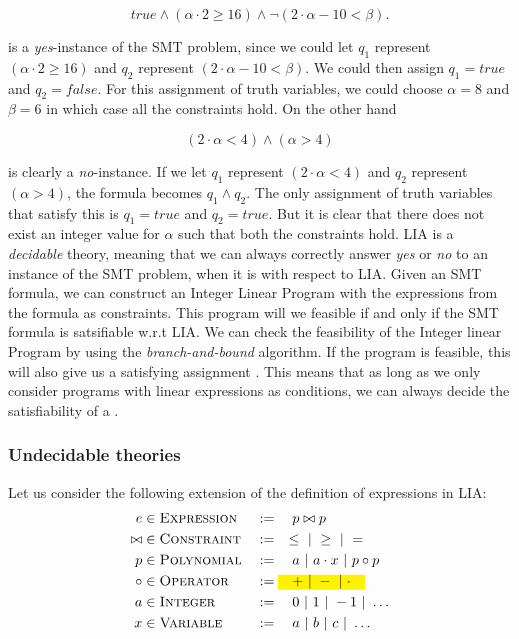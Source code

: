 	\begin{equation*}	
	true \land (\alpha \cdot 2 \geq 16) \land \neg (2\cdot \alpha - 10 < \beta).
	\end{equation*}

	is a \emph{yes}-instance of the SMT problem, since we could let $q_1$ represent $(\alpha \cdot 2 \geq 16)$ and $q_2$ represent $(2\cdot \alpha - 10 < \beta)$. We could then assign $q_1 = true$ and $q_2 = false$. For this assignment of truth variables, we could choose $\alpha = 8$ and $\beta = 6$ in which case all the constraints hold. On the other hand 
	
	\begin{equation*}
		(2\cdot \alpha < 4) \land (\alpha > 4)
	\end{equation*}
	
	is clearly a \emph{no}-instance. If we let $q_1$ represent $(2\cdot \alpha < 4)$ and $q_2$ represent $(\alpha > 4)$, the formula becomes $q_1\land q_2$. The only assignment of truth variables that satisfy this is $q_1 = true$ and $q_2 = true$. But it is clear that there does not exist an integer value for $\alpha$ such that both the constraints hold. LIA is a \emph{decidable} theory, meaning that we can always correctly answer \emph{yes} or \emph{no} to an instance of the SMT problem, when it is with respect to LIA. Given an SMT formula, we can construct an Integer Linear Program with the expressions from the formula as constraints. This program will we feasible if and only if the SMT formula is satsifiable w.r.t LIA. We can check the feasibility of the Integer linear Program by using the \emph{branch-and-bound} algorithm. If the program is feasible, this will also give us a satisfying assignment \cite{Vanderbei01linearprogramming:}. This means that as long as we only consider programs with linear expressions as conditions, we can always decide the satisfiability of a \pc.
	
	\subsubsection{Undecidable theories}
	Let us consider the following extension of the definition of expressions in LIA:
	\begin{alignat*}{3}
		e & \in \textsc{Expression} && := \quad p \bowtie p\\
		\bowtie & \in \textsc{Constraint} && := \quad \leq \alt \geq \alt =\\
		p & \in \textsc{Polynomial} && := \quad a \alt a\cdot x \alt p \circ p\\
		\circ & \in \textsc{Operator} && := \text{\hl{$\quad + \alt - \alt \cdot \quad$}} \\
		a & \in \textsc{Integer} && := \quad 0 \alt 1 \alt -1 \alt \ldots\\ 
		x & \in \textsc{Variable} && := \quad a \alt b \alt c \alt \ldots
	\end{alignat*}
	
